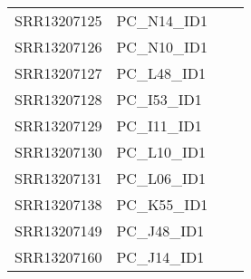 \begin{table}[ht]
\begin{tabular}{llll}
SRR13207125 & PC\_N14\_ID1 \\
SRR13207126 & PC\_N10\_ID1 \\
SRR13207127 & PC\_L48\_ID1 \\
SRR13207128 & PC\_I53\_ID1 \\
SRR13207129 & PC\_I11\_ID1 \\
SRR13207130 & PC\_L10\_ID1 \\
SRR13207131 & PC\_L06\_ID1 \\
SRR13207138 & PC\_K55\_ID1 \\
SRR13207149 & PC\_J48\_ID1 \\
SRR13207160 & PC\_J14\_ID1 \\
\hline 
\end{tabular} 
\end{table}
